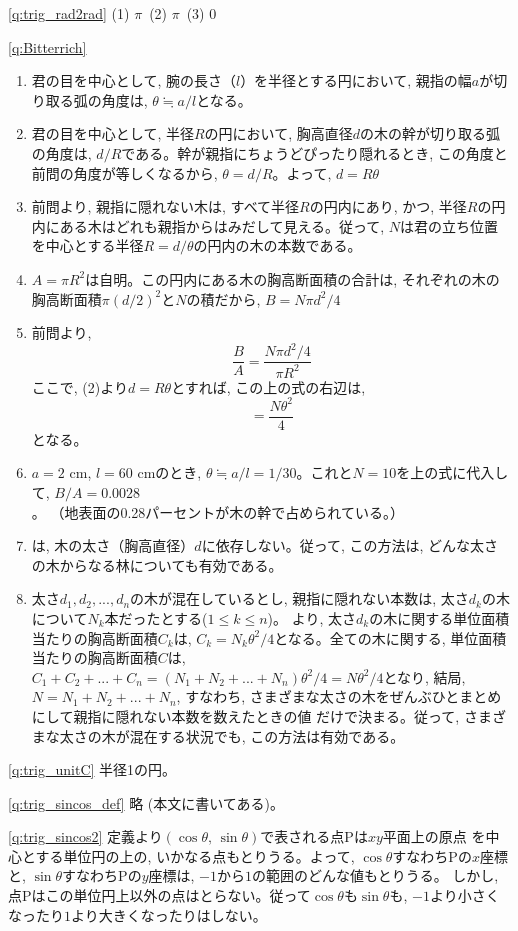 \ref{q:trig_rad2rad}  (1) $\pi\,$ (2) $\pi\,$ (3) $0$
\mv


\ref{q:Bitterrich}
\begin{enumerate}
\item 君の目を中心として, 腕の長さ（$l$）を半径とする円において, 親指の幅$a$が切り取る弧の角度は, $\theta \fallingdotseq a/l$となる。
\item 君の目を中心として, 半径$R$の円において, 胸高直径$d$の木の幹が切り取る弧の角度は, $d/R$である。幹が親指にちょうどぴったり隠れるとき, 
この角度と前問の角度が等しくなるから, $\theta=d/R$。よって, $d=R\theta$
\item 前問より, 親指に隠れない木は, すべて半径$R$の円内にあり, かつ, 半径$R$の円内にある木はどれも親指からはみだして見える。従って, 
$N$は君の立ち位置を中心とする半径$R=d/\theta$の円内の木の本数である。
\item $A=\pi R^2$は自明。この円内にある木の胸高断面積の合計は, それぞれの木の胸高断面積$\pi (d/2)^2$と$N$の積だから, $B=N\pi d^2/4$
\item 前問より, 
\[\frac{B}{A}=\frac{N\pi d^2/4}{\pi R^2}\]
ここで, (2)より$d=R\theta$とすれば, この上の式の右辺は, 
\[=\frac{N\theta^2}{4}\]
となる。
\item $a=2$ cm, $l=60$ cmのとき, $\theta \fallingdotseq a/l= 1/30$。これと$N=10$を上の式に代入して, $B/A=0.0028$。
（地表面の0.28パーセントが木の幹で占められている。）
\item {}は, 木の太さ（胸高直径）$d$に依存しない。従って, この方法は, どんな太さの木からなる林についても有効である。
\item 太さ$d_1, d_2, ..., d_n$の木が混在しているとし, 親指に隠れない本数は, 太さ$d_k$の木について$N_k$本だったとする($1\leq k\leq n$)。
より, 太さ$d_k$の木に関する単位面積当たりの胸高断面積$C_k$は, $C_k=N_k\theta^2/4$となる。全ての木に関する, 
単位面積当たりの胸高断面積$C$は, $C_1+C_2+...+C_n=(N_1+N_2+...+N_n)\theta^2/4=N\theta^2/4$となり, 結局, 
$N=N_1+N_2+...+N_n$, すなわち, さまざまな太さの木をぜんぶひとまとめにして親指に隠れない本数を数えたときの値
だけで決まる。従って, さまざまな太さの木が混在する状況でも, この方法は有効である。
\end{enumerate}
\mv

\ref{q:trig_unitC} 
半径1の円。
\mv

\ref{q:trig_sincos_def} 略 (本文に書いてある)。
\mv

\ref{q:trig_sincos2} 
定義より$(\cos\theta,\, \sin\theta)$で表される点Pは$xy$平面上の原点
を中心とする単位円の上の, いかなる点もとりうる。よって, $\cos \theta$すなわちPの$x$座標と, 
$\sin \theta$すなわちPの$y$座標は, $-1$から$1$の範囲のどんな値もとりうる。
しかし, 点Pはこの単位円上以外の点はとらない。従って$\cos \theta$も$\sin \theta$も, 
$-1$より小さくなったり$1$より大きくなったりはしない。\mv

